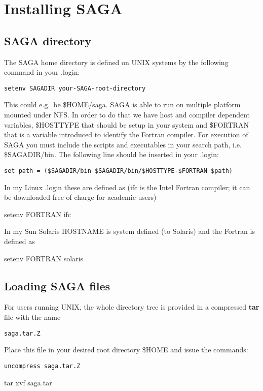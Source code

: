 \documentclass{saclantc}
\begin{document}
\section{Installing  SAGA}


\subsection{SAGA directory}
The {\sf SAGA} home directory is defined on UNIX systems by the
following command in your .login:
 
\noindent
{\tt setenv SAGADIR  your-SAGA-root-directory}

This could e.g.\ be \$HOME/saga. 
SAGA is able to run on multiple platform mounted under NFS. In order
to do that we have  host and compiler dependent variables,
\$HOSTTYPE that should be setup in your system and \$FORTRAN
that is a variable introduced to identify the Fortran compiler.
For execution of  {\sf SAGA} you must include the scripts and executables in your
search path, i.e. \$SAGADIR/bin. The following line should be
inserted in your .login:

\noindent
{\tt set path = (\$SAGADIR/bin  \$SAGADIR/bin/\$HOSTTYPE-\$FORTRAN \$path)}


In my Linux .login these are defined as (ifc is the Intel Fortran
compiler; it can be downloaded free of charge for academic users)

\begin{tt}
setenv FORTRAN    ifc \\
\end{tt}

In my Sun Solaris HOSTNAME is system defined (to Solaris) and the
Fortran is defined as

\begin{tt}
setenv FORTRAN    solaris
\end{tt}

\subsection{Loading  SAGA files}

For users running UNIX, the whole  directory tree is provided 
in a compressed {\bf tar} file with the name

{\tt saga.tar.Z}

\noindent Place this file in your desired root directory \$HOME and issue the
commands:

{\tt uncompress saga.tar.Z

tar xvf saga.tar}
\end{document}
